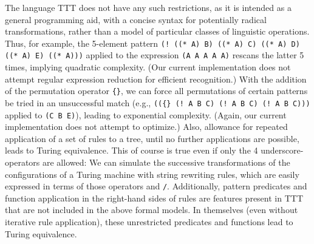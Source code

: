 \documentclass[a4,11pt]{article}
\begin{document}
The language TTT does not have any such restrictions, as it is intended as a general programming aid, with a concise syntax for potentially radical transformations, rather than a model of particular classes of linguistic operations. Thus, for example, the 5-element pattern \texttt{(! ((* A) B) ((* A) C) ((* A) D) ((* A) E) ((* A)))} applied to the expression \texttt{(A A A A A)} rescans the latter 5 times, implying quadratic complexity. (Our current implementation does not attempt regular expression reduction for efficient recognition.) With the addition of the permutation operator \texttt{\{\}}, we can force all permutations of certain patterns be tried in an unsuccessful match (e.g., \texttt{((\{\} (! A B C) (! A B C) (! A B C)))} applied to \texttt{(C B E)}), leading to exponential complexity. (Again, our current implementation does not attempt to optimize.) Also, allowance for repeated application of a set of rules to a tree, until no further applications are possible, leads to Turing equivalence. This of course is true even if only the 4 underscore-operators are allowed: We can simulate the successive transformations of the configurations of a Turing machine with string rewriting rules, which are easily expressed in terms of those operators and \texttt{/}.
Additionally, pattern predicates and function application in the right-hand sides of rules are features present in TTT that are not included in the above formal models. In themselves (even without iterative rule application), these unrestricted predicates and functions lead to Turing equivalence.

\end{document}
